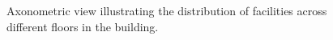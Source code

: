 \begin{figure}[H]
	\centering
	
	\caption*{%
		Axonometric view illustrating the distribution of facilities across different floors in the building.
	}
	\label{
		fig:kemayoran-a4b--axonometric
	}
\end{figure}
